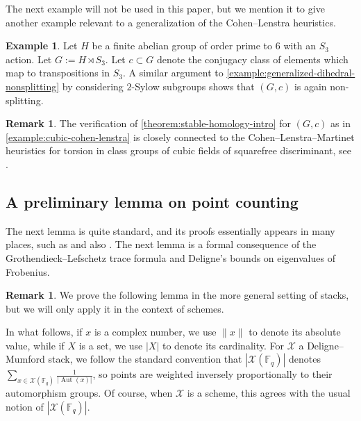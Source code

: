 \documentclass[12 pt]{amsart}
\theoremstyle{plain}
\theoremstyle{definition}
\newtheorem{remark}[theorem]{Remark}
\newtheorem{example}[theorem]{Example}
\theoremstyle{remark}
\numberwithin{equation}{section}
\DeclareMathOperator\aut{Aut}
\begin{document}
The next example will not be used in this paper, but we mention it to give
another example relevant to a generalization of the Cohen--Lenstra heuristics.
\begin{example}
	\label{example:cubic-cohen-lenstra}
	Let $H$ be a finite abelian group of order prime to $6$ with an $S_3$
	action. Let $G := H
	\rtimes S_3$.
	Let $c \subset G$ denote the conjugacy class of elements which map to
	transpositions in $S_3$.
	A similar argument to
	\autoref{example:generalized-dihedral-nonsplitting} by considering
	$2$-Sylow subgroups shows that $(G,c)$ is again non-splitting.
\end{example}
\begin{remark}
	\label{remark:}
	The verification of \autoref{theorem:stable-homology-intro} for $(G,c)$
	as in \autoref{example:cubic-cohen-lenstra} 
	is closely connected to the Cohen--Lenstra--Martinet heuristics for
	torsion in class groups of cubic fields of
	squarefree discriminant, see
	\cite[\S6.1]{ellenbergVWhomologicalII}.
\end{remark}



\subsection{A preliminary lemma on point counting}
The next lemma is quite standard, and its proofs essentially appears in many places, such as 
\cite[Theorem 8.8]{EllenbergVW:cohenLenstra} and also
\cite[Theorem
9.2.4]{ellenbergL:homological-stability-for-generalized-hurwitz-spaces}.
The next lemma is a formal consequence of the
Grothendieck--Lefschetz trace formula and Deligne's bounds on eigenvalues of
Frobenius.

\begin{remark}
	\label{remark:}
	We prove the following lemma in the more general setting of stacks, but we will
only apply it in the context of schemes.
\end{remark}
In what follows, if $x$ is a complex number, we use $\| x \|$ to denote its
absolute value, while if $X$ is a set, we use $|X|$ to denote its cardinality.
For $\mathscr X$ a Deligne--Mumford stack, we follow the standard convention that 
$| \mathscr X(\mathbb F_q)|$ denotes $\sum_{x \in \mathscr X(\mathbb F_q)}
\frac{1}{|\aut(x)|}$, so points are weighted inversely proportionally to their
automorphism groups.
Of course, when $\mathscr X$ is a scheme, this agrees with the usual notion of
$|\mathscr X(\mathbb F_q)|$.
\end{document}
